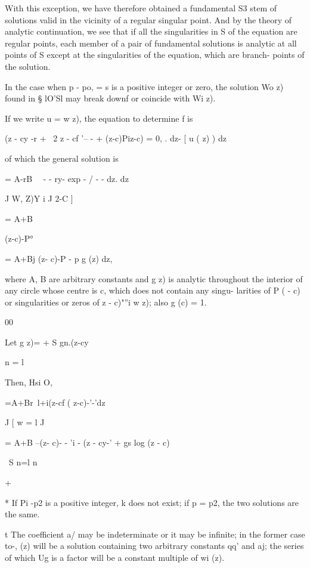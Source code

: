 With this exception, we have therefore obtained a fundamental S3 stem
of solutions valid in the vicinity of a regular singular point. And by
the theory of analytic continuation, we see that if all the
singularities in S of the equation are regular points, each member of
a pair of fundamental solutions is analytic at all points of S except
at the singularities of the equation, which are branch- points of the
solution.


In the case when p - po, = s is a positive integer or zero, the
solution Wo z) found in § lO'Sl may break downf or coincide with Wi
z).

If we write u = w z), the equation to determine f is

(z - cy -r + \ 2 z - cf '-- - + (z-c)Piz-c) = 0, . dz- [ u ( z) ) dz

of which the general solution is

 = A-rB\ ~ - - ry- exp - / - - dz. dz

J W, Z)Y i J 2-C ]

= A+B

(z-c)-P°

= A+Bj (z- c)-P - p g (z) dz,

where A, B are arbitrary constants and g z) is analytic throughout the
interior of any circle whose centre is c, which does not contain any
singu- larities of P ( - c) or singularities or zeros of z - c)"''i w
z); also g (c) = 1.

00

Let g z)= + S gn.(z-cy\

n = l

Then, Hsi O,

 =A+Br\ l+i(z-cf ( z-c)-'-'dz

J [ w = l J

= A+B --(z- c)- - 'i - (z - cy-' + gs log (z - c)

\ S n=l n

+ %

* If Pi -p2 is a positive integer, k does not exist; if p = p2, the
two solutions are the same.

t The coefficient a/ may be indeterminate or it may be infinite; in
the former case to-, (z) will be a solution containing two arbitrary
constants qq' and aj; the series of which Ug is a factor will be a
constant multiple of wi (z).

